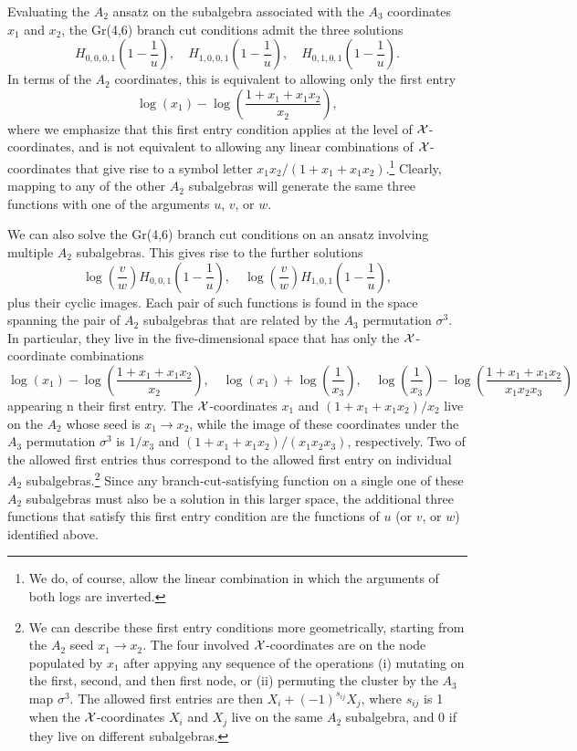 \documentclass[12pt]{article}
\begin{document}
Evaluating the $A_2$ ansatz on the subalgebra associated with the $A_3$ coordinates $x_1$ and $x_2$, the Gr(4,6) branch cut conditions admit the three solutions 
$$H_{0,0,0,1}\left(1-\frac1u \right), \quad H_{1,0,0,1}\left(1-\frac1u \right), \quad H_{0,1,0,1}\left(1-\frac1u \right).$$
In terms of the $A_2$ coordinates, this is equivalent to allowing only the first entry
$$\log (x_1)- \log \left ( \frac{1 + x_1 + x_1 x_2}{x_2} \right),$$
where we emphasize that this first entry condition applies at the level of ${\cal X}$-coordinates, and is not equivalent to allowing any linear combinations of ${\cal X}$-coordinates that give rise to a symbol letter $x_1 x_2/(1+x_1 + x_1 x_2)$.\footnote{We do, of course, allow the linear combination in which the arguments of both logs are inverted.} Clearly, mapping to any of the other $A_2$ subalgebras will generate the same three functions with one of the arguments $u$, $v$, or $w$.

We can also solve the Gr(4,6) branch cut conditions on an ansatz involving multiple $A_2$ subalgebras. This gives rise to the further solutions
$$\log \left( \frac v w \right) H_{0, 0, 1} \left(1-\frac1u \right), \quad  \log \left( \frac v w \right) H_{1, 0, 1} \left(1-\frac1u \right),$$
plus their cyclic images. Each pair of such functions is found in the space spanning the pair of $A_2$ subalgebras that are related by the $A_3$ permutation $\sigma^3$. In particular, they live in the five-dimensional space that has only the ${\cal X}$-coordinate combinations 
$$\log(x_1) -\log \left( \frac{1 + x_1 + x_1 x_2}{x_2} \right), \quad \log(x_1) + \log \left( \frac{1}{x_3} \right), \quad \log \left( \frac{1}{x_3} \right) - \log \left( \frac{1 + x_1 + x_1 x_2}{x_1 x_2 x_3} \right) $$
appearing n their first entry. The ${\cal X}$-coordinates $x_1$ and $(1 + x_1 + x_1 x_2)/x_2$ live on the $A_2$ whose seed is $x_1 \rightarrow x_2$, while the image of these coordinates under the $A_3$ permutation $\sigma^3$ is $1/x_3$ and $(1 + x_1 + x_1 x_2)/(x_1 x_2 x_3)$, respectively. Two of the allowed first entries thus correspond to the allowed first entry on individual $A_2$ subalgebras.\footnote{We can describe these first entry conditions more geometrically, starting from the $A_2$ seed $x_1\rightarrow x_2$. The four involved ${\cal X}$-coordinates are on the node populated by $x_1$ after appying any sequence of the operations (i) mutating on the first, second, and then first node, or (ii) permuting the cluster by the $A_3$ map $\sigma^3$. The allowed first entries are then $X_i + (-1)^{s_{ij}}X_j$, where $s_{ij}$ is 1 when the ${\cal X}$-coordinates $X_i$ and $X_j$ live on the same $A_2$ subalgebra, and 0 if they live on different subalgebras.} Since any branch-cut-satisfying function on a single one of these $A_2$ subalgebras must also be a solution in this larger space, the additional three functions that satisfy this first entry condition are the functions of $u$ (or $v$, or $w$) identified above. 
\end{document}
